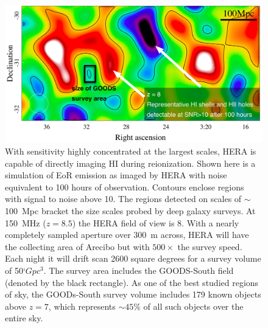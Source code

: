 \documentclass[preprint]{aastex}
\begin{document}

\begin{figure}[!ht]\centering
\includegraphics[width=\textwidth]{plots/Imaging/HERA_331_z8_SNR_annotated.jpg}%
\caption{\small
With sensitivity highly concentrated at the largest scales, HERA is capable of directly imaging HI during reionization.  Shown here is a simulation of EoR emission \citep{mcquinn_et_al2007} as imaged by HERA with noise equivalent to 100 hours of observation.  
Contours enclose regions with signal to noise above 10.  The regions detected on scales of $\sim$100~Mpc bracket the size scales probed by deep galaxy surveys.  At 150~MHz ($z=8.5$) the HERA field of view is 8\arcdeg.  With a nearly completely sampled aperture over 300~m across, HERA will have the collecting area of Arecibo but with $500\times$ the survey speed. Each night it will drift scan 2600 square degrees for a survey volume of 50`$Gpc^3$.  The survey area includes the GOODS-South field \citep{dickinson_et_al2003} (denoted by the black rectangle).  As one of the best studied regions of sky, the GOODs-South survey volume includes 179 known objects above $z=7$, which represents $\sim45\%$ of all such objects over the entire sky.}  \label{fig:imaging}
\end{figure}    
\end{document}
